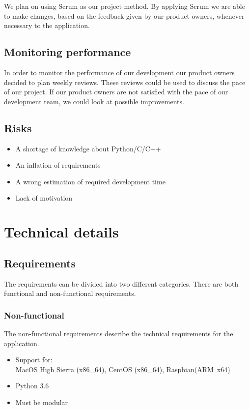 \documentclass[a4paper,11pt]{report}
\begin{document}
    We plan on using Scrum as our project method. By applying Scrum we are able to make changes, based on the feedback given by our product owners, whenever necessary to the application.
    
    \section{Monitoring performance}
    
    In order to monitor the performance of our development our product owners decided to plan weekly reviews. These reviews could be used to discuss the pace of our project. 
    If our product owners are not satisfied with the pace of our development team, we could look at possible improvements.
    
    \section{Risks}
    
    \begin{itemize}
        \item A shortage of knowledge about Python/C/C++
        \item An inflation of requirements
        \item A wrong estimation of required development time
        \item Lack of motivation
    \end{itemize}
    
    \chapter{Technical details}
    
    \section{Requirements}
    
    The requirements can be divided into two different categories. There are both functional and non-functional requirements.
    
    \subsection{Non-functional}
    
    The non-functional requirements describe the technical requirements for the application.
    
    \begin{itemize}
        \item Support for:\\ MacOS High Sierra (x86\_64), CentOS (x86\_64), Raspbian(ARM\ x64)
        \item Python 3.6
        \item Must be modular
    \end{itemize}
    
\end{document}
